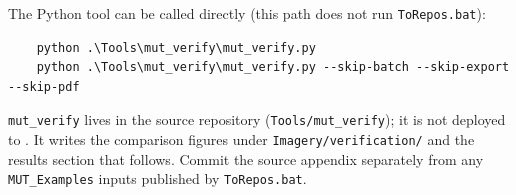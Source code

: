 The Python tool can be called directly (this path does not run \texttt{ToRepos.bat}):
\begin{verbatim}
    python .\Tools\mut_verify\mut_verify.py
    python .\Tools\mut_verify\mut_verify.py --skip-batch --skip-export --skip-pdf
\end{verbatim}

\texttt{mut\_verify} lives in the source repository (\texttt{Tools/mut\_verify}); it is not deployed to \bin. It writes the comparison figures under \texttt{Imagery/verification/} and the results section that follows. Commit the source appendix separately from any \texttt{MUT\_Examples} inputs published by \texttt{ToRepos.bat}.

